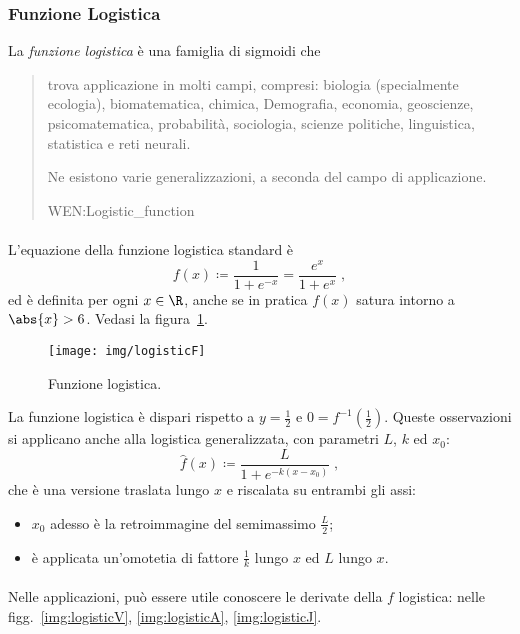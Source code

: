 \subsubsection{Funzione Logistica}
La \emph{funzione logistica} è una famiglia di sigmoidi che

\blockquote[WEN:Logistic_function]{\ellipsis trova applicazione in molti campi,
compresi: biologia (specialmente ecologia), biomatematica, chimica, Demografia, economia,
geoscienze, psicomatematica, probabilità, sociologia, scienze politiche, linguistica,
statistica e reti neurali.

Ne esistono varie generalizzazioni, a seconda del campo di applicazione.}

\paragraph{}
L'equazione della funzione logistica standard è
\begin{equation}
    f(x) \coloneq \frac{1}{1 + e^{-x}} = \frac{e^x}{1+e^x} \; ,
    \label{eq:logisticF}
\end{equation}
ed è definita per ogni $x \in \R$, anche se in pratica $f(x)$ satura intorno a $\abs{x} > 6$.
Vedasi la figura~\ref{img:logisticF}.

\begin{figure}[pbh]
    \centering
    \texttt{[image: img/logisticF]}

    \caption[Funzione logistica]{Funzione logistica.}
    \label{img:logisticF}
\end{figure}

La funzione logistica è dispari rispetto a  $y=\frac{1}{2}$ e $0 = f^{-1} \left( \frac{1}{2} \right)$. Queste osservazioni si applicano anche alla logistica generalizzata, con parametri $L$, $k$ ed $x_0$:
\begin{equation}
    \hat{f}(x) \coloneq \frac{L}{1+e^{-k(x -x_0)}} \; ,
    \label{eq:logisticFgen}
\end{equation}
che è una versione traslata lungo $x$ e riscalata su entrambi gli assi:
\begin{itemize}
    \item $x_0$ adesso è la retroimmagine del semimassimo $\frac{L}{2}$;
    \item è applicata un'omotetia di fattore $\frac{1}{k}$ lungo $x$ ed $L$ lungo $x$.
\end{itemize}

\paragraph{}
Nelle applicazioni, può essere utile conoscere le derivate della $f$ logistica:
nelle figg.~\ref{img:logisticV}, \ref{img:logisticA}, \ref{img:logisticJ}.

